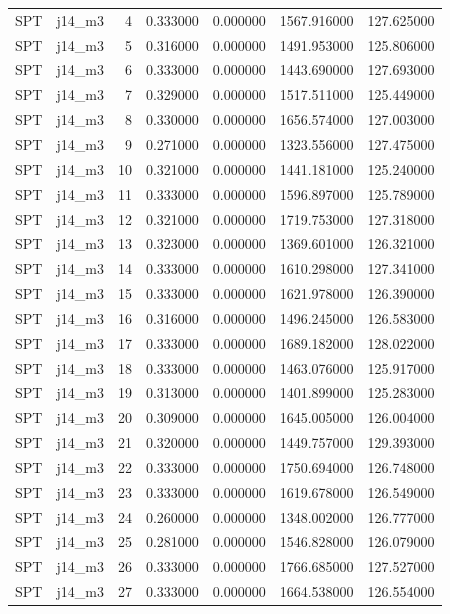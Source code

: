 \begin{tabular}{llrrrrr}
SPT & j14_m3 & 4 & 0.333000 & 0.000000 & 1567.916000 & 127.625000 \\
SPT & j14_m3 & 5 & 0.316000 & 0.000000 & 1491.953000 & 125.806000 \\
SPT & j14_m3 & 6 & 0.333000 & 0.000000 & 1443.690000 & 127.693000 \\
SPT & j14_m3 & 7 & 0.329000 & 0.000000 & 1517.511000 & 125.449000 \\
SPT & j14_m3 & 8 & 0.330000 & 0.000000 & 1656.574000 & 127.003000 \\
SPT & j14_m3 & 9 & 0.271000 & 0.000000 & 1323.556000 & 127.475000 \\
SPT & j14_m3 & 10 & 0.321000 & 0.000000 & 1441.181000 & 125.240000 \\
SPT & j14_m3 & 11 & 0.333000 & 0.000000 & 1596.897000 & 125.789000 \\
SPT & j14_m3 & 12 & 0.321000 & 0.000000 & 1719.753000 & 127.318000 \\
SPT & j14_m3 & 13 & 0.323000 & 0.000000 & 1369.601000 & 126.321000 \\
SPT & j14_m3 & 14 & 0.333000 & 0.000000 & 1610.298000 & 127.341000 \\
SPT & j14_m3 & 15 & 0.333000 & 0.000000 & 1621.978000 & 126.390000 \\
SPT & j14_m3 & 16 & 0.316000 & 0.000000 & 1496.245000 & 126.583000 \\
SPT & j14_m3 & 17 & 0.333000 & 0.000000 & 1689.182000 & 128.022000 \\
SPT & j14_m3 & 18 & 0.333000 & 0.000000 & 1463.076000 & 125.917000 \\
SPT & j14_m3 & 19 & 0.313000 & 0.000000 & 1401.899000 & 125.283000 \\
SPT & j14_m3 & 20 & 0.309000 & 0.000000 & 1645.005000 & 126.004000 \\
SPT & j14_m3 & 21 & 0.320000 & 0.000000 & 1449.757000 & 129.393000 \\
SPT & j14_m3 & 22 & 0.333000 & 0.000000 & 1750.694000 & 126.748000 \\
SPT & j14_m3 & 23 & 0.333000 & 0.000000 & 1619.678000 & 126.549000 \\
SPT & j14_m3 & 24 & 0.260000 & 0.000000 & 1348.002000 & 126.777000 \\
SPT & j14_m3 & 25 & 0.281000 & 0.000000 & 1546.828000 & 126.079000 \\
SPT & j14_m3 & 26 & 0.333000 & 0.000000 & 1766.685000 & 127.527000 \\
SPT & j14_m3 & 27 & 0.333000 & 0.000000 & 1664.538000 & 126.554000 \\

\end{tabular}

